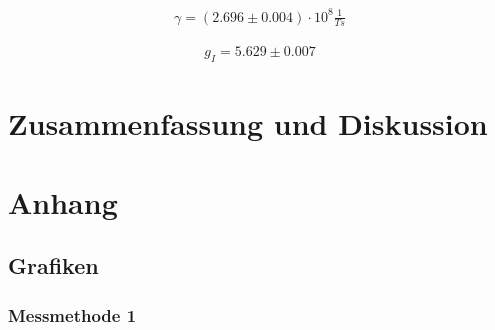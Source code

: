 \documentclass[12pt]{article}
\begin{document}
\begin{align*}
\gamma = (2.696\pm 0.004) \cdot 10^8 \frac{1}{Ts}
\end{align*}

\begin{align*}
g_I = 5.629  \pm 0.007
\end{align*}

\section{Zusammenfassung und Diskussion}


\newpage
\section{Anhang} 

\subsection{Grafiken}
\subsubsection{Messmethode 1}
\end{document}
